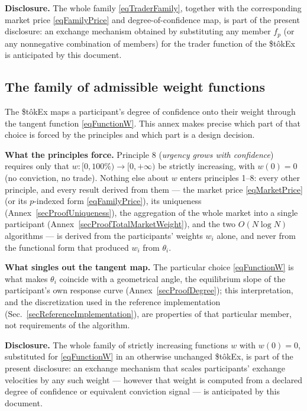 \documentclass[letterpaper]{article}
\newcommand{\StokEx}{\$t\^{o}kEx}
\begin{document}
\textbf{Disclosure.} The whole family \eqref{eqTraderFamily}, together with the corresponding market price \eqref{eqFamilyPrice} and degree-of-confidence map, is part of the present disclosure: an exchange mechanism obtained by substituting any member $f_p$ (or any nonnegative combination of members) for the trader function of the \StokEx{} is anticipated by this document.

\subsection{The family of admissible weight functions}\label{secWeightFamily}

The \StokEx{} maps a participant's degree of confidence onto their weight through the tangent function \eqref{eqFunctionW}. This annex makes precise which part of that choice is forced by the principles and which part is a design decision.

\textbf{What the principles force.} Principle 8 (\emph{urgency grows with confidence}) requires only that $w: [0,100\%) \to [0,+\infty)$ be strictly increasing, with $w(0) = 0$ (no conviction, no trade). Nothing else about $w$ enters principles 1--8: every other principle, and every result derived from them --- the market price \eqref{eqMarketPrice} (or its $p$-indexed form \eqref{eqFamilyPrice}), its uniqueness (Annex~\ref{secProofUniqueness}), the aggregation of the whole market into a single participant (Annex~\ref{secProofTotalMarketWeight}), and the two $O(N \log N)$ algorithms --- is derived from the participants' weights $w_i$ alone, and never from the functional form that produced $w_i$ from $\theta_i$.

\textbf{What singles out the tangent map.} The particular choice \eqref{eqFunctionW} is what makes $\theta_i$ coincide with a geometrical angle, the equilibrium slope of the participant's own response curve (Annex~\ref{secProofDegree}); this interpretation, and the discretization used in the reference implementation (Sec.~\ref{secReferenceImplementation}), are properties of that particular member, not requirements of the algorithm.

\textbf{Disclosure.} The whole family of strictly increasing functions $w$ with $w(0) = 0$, substituted for \eqref{eqFunctionW} in an otherwise unchanged \StokEx{}, is part of the present disclosure: an exchange mechanism that scales participants' exchange velocities by any such weight --- however that weight is computed from a declared degree of confidence or equivalent conviction signal --- is anticipated by this document.
\end{document}
